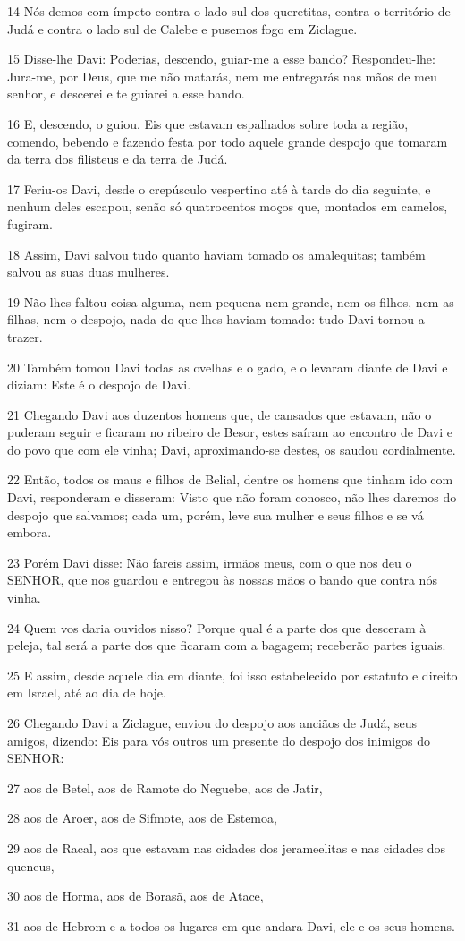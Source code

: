\par 14 Nós demos com ímpeto contra o lado sul dos queretitas, contra o território de Judá e contra o lado sul de Calebe e pusemos fogo em Ziclague.
\par 15 Disse-lhe Davi: Poderias, descendo, guiar-me a esse bando? Respondeu-lhe: Jura-me, por Deus, que me não matarás, nem me entregarás nas mãos de meu senhor, e descerei e te guiarei a esse bando.
\par 16 E, descendo, o guiou. Eis que estavam espalhados sobre toda a região, comendo, bebendo e fazendo festa por todo aquele grande despojo que tomaram da terra dos filisteus e da terra de Judá.
\par 17 Feriu-os Davi, desde o crepúsculo vespertino até à tarde do dia seguinte, e nenhum deles escapou, senão só quatrocentos moços que, montados em camelos, fugiram.
\par 18 Assim, Davi salvou tudo quanto haviam tomado os amalequitas; também salvou as suas duas mulheres.
\par 19 Não lhes faltou coisa alguma, nem pequena nem grande, nem os filhos, nem as filhas, nem o despojo, nada do que lhes haviam tomado: tudo Davi tornou a trazer.
\par 20 Também tomou Davi todas as ovelhas e o gado, e o levaram diante de Davi e diziam: Este é o despojo de Davi.
\par 21 Chegando Davi aos duzentos homens que, de cansados que estavam, não o puderam seguir e ficaram no ribeiro de Besor, estes saíram ao encontro de Davi e do povo que com ele vinha; Davi, aproximando-se destes, os saudou cordialmente.
\par 22 Então, todos os maus e filhos de Belial, dentre os homens que tinham ido com Davi, responderam e disseram: Visto que não foram conosco, não lhes daremos do despojo que salvamos; cada um, porém, leve sua mulher e seus filhos e se vá embora.
\par 23 Porém Davi disse: Não fareis assim, irmãos meus, com o que nos deu o SENHOR, que nos guardou e entregou às nossas mãos o bando que contra nós vinha.
\par 24 Quem vos daria ouvidos nisso? Porque qual é a parte dos que desceram à peleja, tal será a parte dos que ficaram com a bagagem; receberão partes iguais.
\par 25 E assim, desde aquele dia em diante, foi isso estabelecido por estatuto e direito em Israel, até ao dia de hoje.
\par 26 Chegando Davi a Ziclague, enviou do despojo aos anciãos de Judá, seus amigos, dizendo: Eis para vós outros um presente do despojo dos inimigos do SENHOR:
\par 27 aos de Betel, aos de Ramote do Neguebe, aos de Jatir,
\par 28 aos de Aroer, aos de Sifmote, aos de Estemoa,
\par 29 aos de Racal, aos que estavam nas cidades dos jerameelitas e nas cidades dos queneus,
\par 30 aos de Horma, aos de Borasã, aos de Atace,
\par 31 aos de Hebrom e a todos os lugares em que andara Davi, ele e os seus homens.

